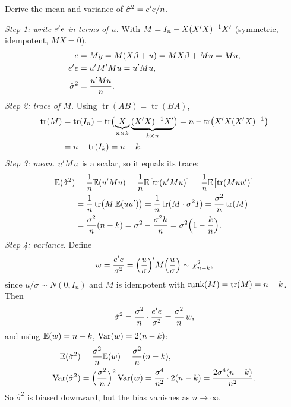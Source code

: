 \documentclass[11pt]{article}
\begin{document}
Derive the mean and variance of $\hat\sigma^2=e^{\prime} e/n$.

\emph{Step 1: write $e^{\prime} e$ in terms of $u$.} With $M=I_n-X(X^{\prime} X)^{-1}X^{\prime}$ (symmetric, idempotent, $MX=0$),
\begin{align*}
  e&=My=M(X\beta+u)=MX\beta+Mu=Mu,\\
  e^{\prime} e&=u^{\prime} M^{\prime} Mu=u^{\prime} Mu,\\
  \hat\sigma^2&=\frac{u^{\prime} Mu}{n}.
\end{align*}
\emph{Step 2: trace of $M$.} Using $\operatorname{tr}(AB)=\operatorname{tr}(BA)$,
\begin{align*}
  \operatorname{tr}(M)&=\operatorname{tr}(I_n)-\operatorname{tr}\bigl(\underbrace{X}_{n\times k}\underbrace{(X^{\prime} X)^{-1}X^{\prime}}_{k\times n}\bigr)
  =n-\operatorname{tr}\bigl(X^{\prime} X(X^{\prime} X)^{-1}\bigr)\\
  &=n-\operatorname{tr}(I_k)=n-k .
\end{align*}
\emph{Step 3: mean.} $u^{\prime} Mu$ is a scalar, so it equals its trace:
\begin{align*}
  \mathbb{E}(\hat\sigma^2)&=\frac1n\mathbb{E}(u^{\prime} Mu)=\frac1n\mathbb{E}\bigl[\operatorname{tr}(u^{\prime} Mu)\bigr]
  =\frac1n\mathbb{E}\bigl[\operatorname{tr}(Muu^{\prime})\bigr]\\
  &=\frac1n\operatorname{tr}\bigl(M\,\mathbb{E}(uu^{\prime})\bigr)=\frac1n\operatorname{tr}(M\cdot\sigma^2I)
  =\frac{\sigma^2}{n}\operatorname{tr}(M)\\
  &=\frac{\sigma^2}{n}(n-k)=\sigma^2-\frac{\sigma^2k}{n}=\sigma^2\Bigl(1-\frac kn\Bigr).
\end{align*}
\emph{Step 4: variance.} Define
\[
  w=\frac{e^{\prime} e}{\sigma^2}=\Bigl(\frac{u}{\sigma}\Bigr)^{\prime} M\Bigl(\frac{u}{\sigma}\Bigr)\sim\chi^2_{n-k},
\]
since $u/\sigma\sim N(0,I_n)$ and $M$ is idempotent with $\operatorname{rank}(M)=\operatorname{tr}(M)=n-k$. Then
\[
  \hat\sigma^2=\frac{\sigma^2}{n}\cdot\frac{e^{\prime} e}{\sigma^2}=\frac{\sigma^2}{n}\,w ,
\]
and using $\mathbb{E}(w)=n-k$, $\operatorname{Var}(w)=2(n-k)$:
\begin{align*}
  \mathbb{E}(\hat\sigma^2)&=\frac{\sigma^2}{n}\mathbb{E}(w)=\frac{\sigma^2}{n}(n-k),\\
  \operatorname{Var}(\hat\sigma^2)&=\Bigl(\frac{\sigma^2}{n}\Bigr)^2\operatorname{Var}(w)=\frac{\sigma^4}{n^2}\cdot2(n-k)=\frac{2\sigma^4(n-k)}{n^2}.
\end{align*}
So $\hat\sigma^2$ is biased downward, but the bias vanishes as $n\to\infty$.
\end{document}
